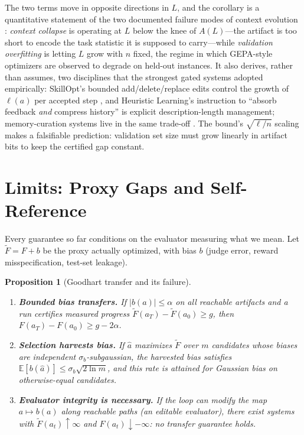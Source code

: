 \documentclass{article}
\theoremstyle{plain}
\newtheorem{proposition}[theorem]{Proposition}
\theoremstyle{definition}
\theoremstyle{remark}
\newcommand{\E}{\mathbb{E}}
\newcommand{\len}{\ell}
\newcommand{\Ftil}{\widetilde{F}}
\begin{document}
The two terms move in opposite directions in $L$, and the corollary is a quantitative statement of the two documented failure modes of context evolution \cite{zhang2025ace}: \emph{context collapse} is operating at $L$ below the knee of $A(L)$---the artifact is too short to encode the task statistic it is supposed to carry---while \emph{validation overfitting} is letting $L$ grow with $n$ fixed, the regime in which GEPA-style optimizers are observed to degrade on held-out instances. It also derives, rather than assumes, two disciplines that the strongest gated systems adopted empirically: SkillOpt's bounded add/delete/replace edits control the growth of $\len(a)$ per accepted step \cite{yang2026skillopt}, and Heuristic Learning's instruction to ``absorb feedback \emph{and} compress history'' \cite{weng2026hl} is explicit description-length management; memory-curation systems live in the same trade-off \cite{packer2023memgpt, suzgun2025cheatsheet}. The bound's $\sqrt{\len/n}$ scaling makes a falsifiable prediction: validation set size must grow linearly in artifact bits to keep the certified gap constant.

\section{Limits: Proxy Gaps and Self-Reference}
\label{sec:limits}

Every guarantee so far conditions on the evaluator measuring what we mean. Let $\Ftil = F + b$ be the proxy actually optimized, with bias $b$ (judge error, reward misspecification, test-set leakage).

\begin{proposition}[Goodhart transfer and its failure]
\label{prop:goodhart}
\begin{enumerate}\itemsep1pt
\item[(i)] \textbf{Bounded bias transfers.} If $|b(a)| \le \alpha$ on all reachable artifacts and a run certifies measured progress $\Ftil(a_T) - \Ftil(a_0) \ge g$, then $F(a_T) - F(a_0) \ge g - 2\alpha$.
\item[(ii)] \textbf{Selection harvests bias.} If $\hat{a}$ maximizes $\Ftil$ over $m$ candidates whose biases are independent $\sigma_b$-subgaussian, the harvested bias satisfies $\E[b(\hat{a})] \le \sigma_b \sqrt{2 \ln m}$, and this rate is attained for Gaussian bias on otherwise-equal candidates.
\item[(iii)] \textbf{Evaluator integrity is necessary.} If the loop can modify the map $a \mapsto b(a)$ along reachable paths (an editable evaluator), there exist systems with $\Ftil(a_t) \uparrow \infty$ and $F(a_t) \downarrow -\infty$: no transfer guarantee holds.
\end{enumerate}
\end{proposition}
\end{document}

